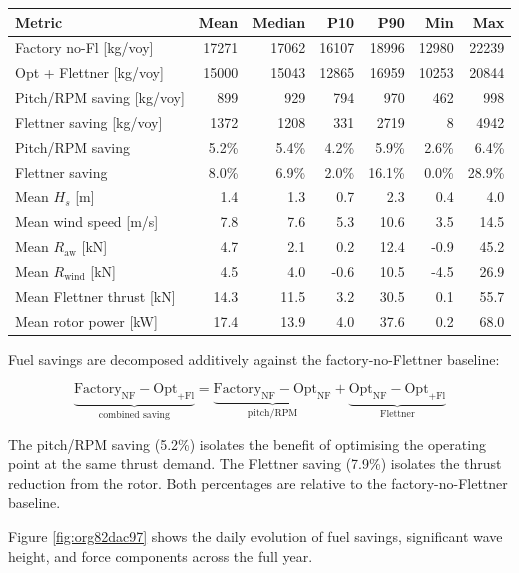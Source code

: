 \documentclass[a4paper,11pt]{article}
\begin{document}
\begin{center}
\begin{tabular}{lrrrrrr}
\toprule
Metric & Mean & Median & P10 & P90 & Min & Max\\[0pt]
\midrule
Factory no-Fl [kg/voy] & 17271 & 17062 & 16107 & 18996 & 12980 & 22239\\[0pt]
Opt + Flettner [kg/voy] & 15000 & 15043 & 12865 & 16959 & 10253 & 20844\\[0pt]
Pitch/RPM saving [kg/voy] & 899 & 929 & 794 & 970 & 462 & 998\\[0pt]
Flettner saving [kg/voy] & 1372 & 1208 & 331 & 2719 & 8 & 4942\\[0pt]
Pitch/RPM saving & 5.2\% & 5.4\% & 4.2\% & 5.9\% & 2.6\% & 6.4\%\\[0pt]
Flettner saving & 8.0\% & 6.9\% & 2.0\% & 16.1\% & 0.0\% & 28.9\%\\[0pt]
Mean \(H_s\) [m] & 1.4 & 1.3 & 0.7 & 2.3 & 0.4 & 4.0\\[0pt]
Mean wind speed [m/s] & 7.8 & 7.6 & 5.3 & 10.6 & 3.5 & 14.5\\[0pt]
Mean \(R_\text{aw}\) [kN] & 4.7 & 2.1 & 0.2 & 12.4 & -0.9 & 45.2\\[0pt]
Mean \(R_\text{wind}\) [kN] & 4.5 & 4.0 & -0.6 & 10.5 & -4.5 & 26.9\\[0pt]
Mean Flettner thrust [kN] & 14.3 & 11.5 & 3.2 & 30.5 & 0.1 & 55.7\\[0pt]
Mean rotor power [kW] & 17.4 & 13.9 & 4.0 & 37.6 & 0.2 & 68.0\\[0pt]
\bottomrule
\end{tabular}
\end{center}

Fuel savings are decomposed additively against the factory-no-Flettner baseline:

\begin{equation}
  \underbrace{\text{Factory}_\text{NF} - \text{Opt}_\text{+Fl}}_{\text{combined saving}}
  = \underbrace{\text{Factory}_\text{NF} - \text{Opt}_\text{NF}}_{\text{pitch/RPM}}
  + \underbrace{\text{Opt}_\text{NF} - \text{Opt}_\text{+Fl}}_{\text{Flettner}}
\end{equation}

The pitch/RPM saving (5.2\%) isolates the benefit of optimising the
operating point at the same thrust demand.  The Flettner saving (7.9\%)
isolates the thrust reduction from the rotor.  Both percentages are relative to
the factory-no-Flettner baseline.

Figure \ref{fig:org82dac97} shows the daily evolution of fuel savings, significant
wave height, and force components across the full year.
\end{document}

